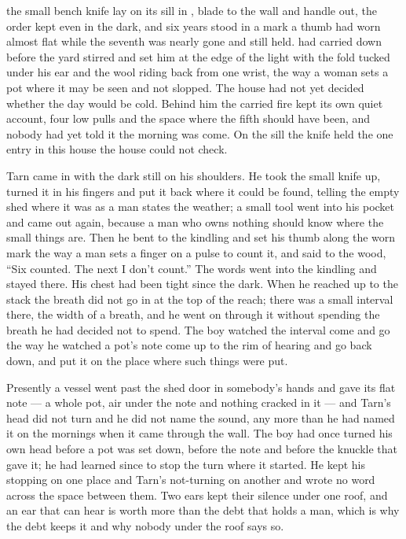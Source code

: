 
 the small bench knife lay on its sill in , blade to the wall and handle out, the order  kept even in the dark, and six years stood in a mark a thumb had worn almost flat while the seventh was nearly gone and still held.  had carried  down before the yard stirred and set him at the edge of the light with the fold tucked under his ear and the wool riding back from one wrist, the way a woman sets a pot where it may be seen and not slopped. The house had not yet decided whether the day would be cold. Behind him the carried fire kept its own quiet account, four low pulls and the space where the fifth should have been, and nobody had yet told it the morning was come. On the sill the knife held the one entry in this house the house could not check.

Tarn came in with the dark still on his shoulders. He took the small knife up, turned it in his fingers and put it back where it could be found, telling the empty shed where it was as a man states the weather; a small tool went into his pocket and came out again, because a man who owns nothing should know where the small things are. Then he bent to the kindling and set his thumb along the worn mark the way a man sets a finger on a pulse to count it, and said to the wood, “Six counted. The next I don't count.” The words went into the kindling and stayed there. His chest had been tight since the dark. When he reached up to the stack the breath did not go in at the top of the reach; there was a small interval there, the width of a breath, and he went on through it without spending the breath he had decided not to spend. The boy watched the interval come and go the way he watched a pot's note come up to the rim of hearing and go back down, and put it on the place where such things were put.

Presently a vessel went past the shed door in somebody's hands and gave its flat note --- a whole pot, air under the note and nothing cracked in it --- and Tarn's head did not turn and he did not name the sound, any more than he had named it on the mornings when it came through the wall. The boy had once turned his own head before a pot was set down, before the note and before the knuckle that gave it; he had learned since to stop the turn where it started. He kept his stopping on one place and Tarn's not-turning on another and wrote no word across the space between them. Two ears kept their silence under one roof, and an ear that can hear is worth more than the debt that holds a man, which is why the debt keeps it and why nobody under the roof says so.

